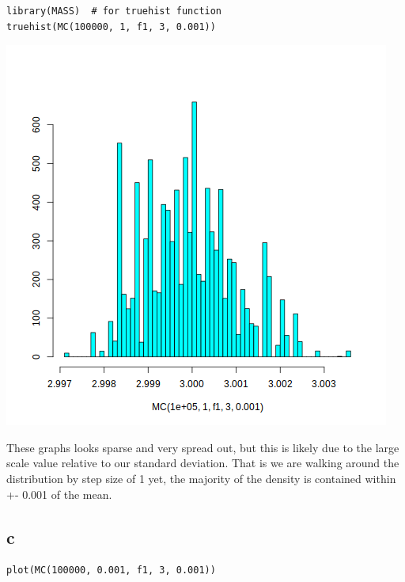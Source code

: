 \documentclass[11pt]{article}
\begin{document}
\begin{verbatim}
library(MASS)  # for truehist function
truehist(MC(100000, 1, f1, 3, 0.001))

\end{verbatim}

\begin{center}
\includegraphics[width=.9\linewidth]{hist.png}
\end{center}


These graphs looks sparse and very spread out, but this is likely due to the large scale value relative to our standard deviation. That is we are walking around the distribution by step size of 1 yet, the majority of the density is contained within +- 0.001 of the mean.

\subsection*{c}
\label{sec:org2784d84}
\begin{verbatim}
plot(MC(100000, 0.001, f1, 3, 0.001))

\end{verbatim}
\end{document}

